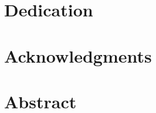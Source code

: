 \documentclass[oneside,letterpaper,12pt]{book}
\begin{document}



\frontmatter



\chapter{Dedication}




\chapter{Acknowledgments}


\tableofcontents
\listoftables
\listoffigures

\chapter{Abstract}


\mainmatter













\begin{singlespace}

%

\end{singlespace}


\appendix



\end{document}
